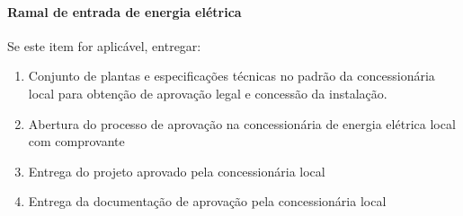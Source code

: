 \paragraph{Ramal de entrada de energia elétrica}
Se este item for aplicável, entregar:
\begin{enumerate}
	\item Conjunto de plantas e especificações técnicas no padrão da concessionária local para obtenção de aprovação legal e concessão da instalação.
	
	\item Abertura do processo de aprovação na concessionária de energia elétrica local com comprovante
	
	\item Entrega do projeto aprovado pela concessionária local
	
	\item Entrega da documentação de aprovação pela concessionária local
\end{enumerate}

